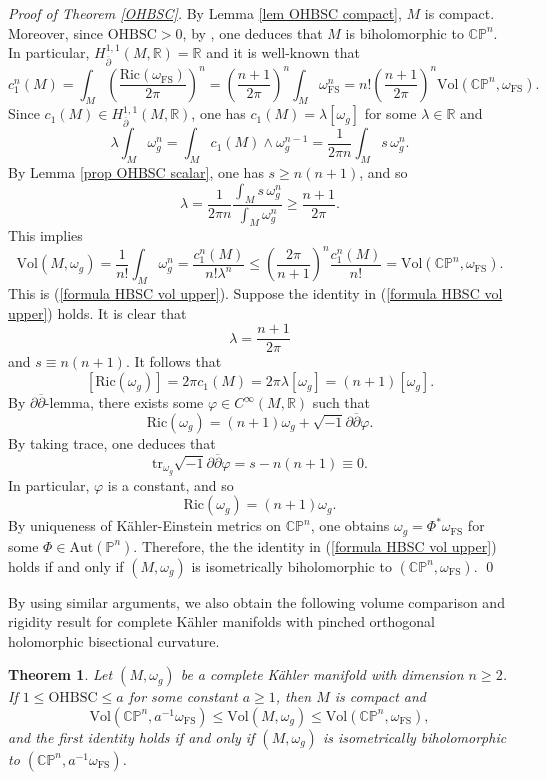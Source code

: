 \documentclass[12pt]{amsart}
\newcommand\bp{{\bar\partial}}
\theoremstyle{plain}
\newtheorem{thm}{Theorem}[section]
\theoremstyle{definition}
\newcommand{\btheorem}{\begin{thm}}
\newcommand{\etheorem}{\end{thm}}
\newcommand{\sq}{\sqrt{-1}}
\newcommand{\p}{\partial}
\renewcommand{\bar}{\overline}
\renewcommand{\phi}{\varphi}
\newcommand{\beq}{\begin{equation}}
\newcommand{\eeq}{\end{equation}}
\renewcommand{\bp}{\bar{\partial}}
\renewcommand{\>}{\rightarrow}
\newcommand{\C}{{\mathbb C}}
\renewcommand{\P}{{\mathbb P}}
\newcommand{\R}{{\mathbb R}}
\newcommand{\om}{\omega}
\numberwithin{equation}{section} %
\begin{document}
\noindent 	\emph{Proof of Theorem \ref{OHBSC}.}		By Lemma \ref{lem OHBSC compact}, $M$ is compact. Moreover, since $\mathrm{OHBSC}>0$,
by \cite[Theorem~3.2]{GZ10},  one deduces that $M$ is biholomorphic to $\C\P^n$.
In particular, $H_{\bp}^{1,1}(M,\R)=\R$ and it is well-known that 
\[  
c^n_1(M)
= \int_{M}\left(\frac{\mathrm{Ric}(\om_{\mathrm{FS}})}{2\pi}\right)^n
= \left(\frac{n+1}{2\pi} \right)^n\int_{M}\om_{\mathrm{FS}}^n
= n!\left(\frac{n+1}{2\pi} \right)^n \mathrm{Vol}(\C\P^n,\om_{\mathrm{FS}}).
\]
Since $c_1(M) \in H_{\bp}^{1,1}(M, \mathbb{R})$,  one has $c_1(M)=\lambda [\omega_g]$ for some $\lambda\in\R$ and
\beq
\lambda \int_M \om_g^n=\int_M c_1(M) \wedge \om_g^{n-1}=\frac{1}{2\pi n} \int_M s\,\om_g^n.
\eeq
By Lemma \ref{prop OHBSC scalar}, one has $s\ge n(n+1)$, and so 
\[
\lambda =\frac{1}{2\pi n} \frac{\int_M s\,\om_g^n}{\int_M \om_g^n}\ge \frac{n+1}{2\pi}.
\]
This implies
$$ \mathrm{Vol}(M,\om_g)
=\frac{1}{n!}\int_M\om_g^n
=\frac{c^n_1(M)}{n!\lambda^n}
\le \left(\frac{2\pi }{n+1} \right)^n \frac{c^n_1(M)}{n!}=\mathrm{Vol}(\C\P^n,\om_{\mathrm{FS}}).$$
This is (\ref{formula HBSC vol upper}).
Suppose the identity in (\ref{formula HBSC vol upper}) holds. It is clear that 
$$\lambda=\frac{n+1}{2\pi}$$
and $s\equiv n(n+1)$.	It follows that 
$$
\left[\mathrm{Ric}(\om_g)\right]=2\pi c_1(M)=2\pi\lambda[\om_g]=(n+1)[\om_g].
$$
By $\p\bp$-lemma, there exists some $\phi\in C^\infty(M,\R)$ such that 
$$
\mathrm{Ric}(\om_g)=(n+1)\om_g+\sq\p\bp\phi.
$$
By taking trace, one deduces  that 
$$
\mathrm{tr}_{\om_g}\sq\p\bp\phi=s-n(n+1)\equiv 0.
$$
In particular, $\phi$ is a constant, and so $$\mathrm{Ric}(\om_g)=(n+1)\om_g.$$
By uniqueness of K\"ahler-Einstein metrics on $\C\P^n$, one obtains $\om_g=\Phi^*\om_{\mathrm{FS}}$ for some $\Phi\in \mathrm{Aut}(\P^n)$. 
Therefore, the the identity in (\ref{formula HBSC vol upper}) holds if and only if $(M,\om_g)$ is isometrically biholomorphic to $(\C\P^n,\om_{\mathrm{FS}})$. \qed 

\baselineskip

\noindent By using similar arguments, we also obtain the following volume comparison and rigidity result for complete K\"ahler manifolds with pinched orthogonal holomorphic bisectional curvature.
\btheorem	Let $(M,\om_g)$ be a complete K\"ahler manifold with dimension $n\ge 2$. If  $1\leq \mathrm{OHBSC}\leq a$ for some constant $a\geq 1$, then $M$ is compact and
\beq 
\mathrm{Vol}(\C\P^n,a^{-1}\om_{\mathrm{FS}})\leq 	\mathrm{Vol}(M,\om_g)\le  \mathrm{Vol}(\C\P^n,\om_{\mathrm{FS}}),
\eeq
and the first identity holds if and only if $(M,\om_g)$ is isometrically biholomorphic to  $(\C\P^n,a^{-1}\om_{\mathrm{FS}})$.
\etheorem 
\end{document}
